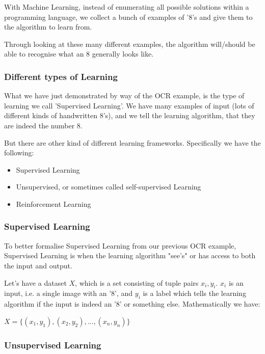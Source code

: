 \documentclass[10pt]{beamer}
\begin{document}
With Machine Learning, instead of enumerating all possible solutions within a
programming language, we collect a bunch of examples of '8's and give them to the
algorithm to learn from.

Through looking at these many different examples, the algorithm will/should be able
to recognise what an 8 generally looks like.

\subsubsection*{Different types of Learning}
\label{sec:org6f7988e}

What we have just demonstrated by way of the OCR example, is the type of learning we
call 'Supervised Learning'. We have many examples of input (lots of different kinds
of handwritten 8's), and we tell the learning algorithm, that they are indeed the
number 8.

But there are other kind of different learning frameworks. Specifically we have the
following:

\begin{itemize}
\item Supervised Learning
\item Unsupervised, or sometimes called self-supervised Learning
\item Reinforcement Learning
\end{itemize}

\subsubsection*{Supervised Learning}
\label{sec:org519e0d1}

To better formalise Supervised Learning from our previous OCR example, Supervised
Learning is when the learning algorithm "see's" or has access to both the input and
output.

Let's have a dataset \(X\), which is a set consisting of tuple pairs \(x_i, y_i\). \(x_i\)
is an input, i.e. a single image with an '8', and \(y_i\) is a label which tells the
learning algorithm if the input is indeed an '8' or something else. Mathematically we have:

\(X = \{(x_1, y_1), (x_2, y_2), ..., (x_n, y_n)\}\)

\subsubsection*{Unsupervised Learning}
\label{sec:org11a010f}
\end{document}

